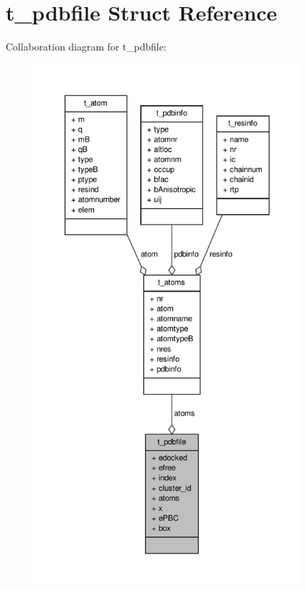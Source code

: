 \hypertarget{structt__pdbfile}{\section{t\-\_\-pdbfile \-Struct \-Reference}
\label{structt__pdbfile}
}


\-Collaboration diagram for t\-\_\-pdbfile\-:
\nopagebreak
\begin{figure}[H]
\begin{center}
\leavevmode
\includegraphics[height=550pt]{structt__pdbfile__coll__graph}
\end{center}
\end{figure}
